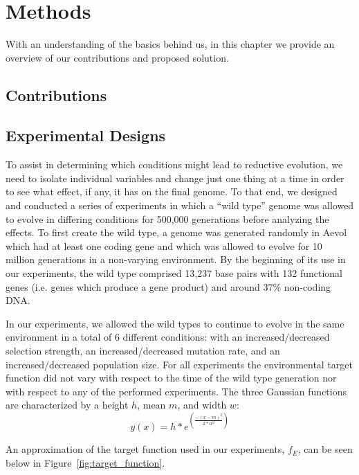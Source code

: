 \chapter{Methods}\label{ch:methods}
With an understanding of the basics behind us, in this chapter we provide an overview of our contributions and proposed solution.

\section{Contributions}

\section{Experimental Designs} \label{experimental_design}
To assist in determining which conditions might lead to reductive evolution, we need to isolate individual variables and change just one thing at a time in order to see what effect, if any, it has on the final genome. To that end, we designed and conducted a series of experiments in which a ``wild type'' genome was allowed to evolve in differing conditions for 500,000 generations before analyzing the effects. To first create the wild type, a genome was generated randomly in Aevol which had at least one coding gene and which was allowed to evolve for 10 million generations in a non-varying environment. By the beginning of its use in our experiments, the wild type comprised 13,237 base pairs with 132 functional genes (i.e. genes which produce a gene product) and around 37\% non-coding DNA. 

In our experiments, we allowed the wild types to continue to evolve in the same environment in a total of 6 different conditions: with an increased/decreased selection strength, an increased/decreased mutation rate, and an increased/decreased population size.  For all experiments the environmental target function did not vary with respect to the time of the wild type generation nor with respect to any of the performed experiments. The three Gaussian functions are characterized by a height $h$, mean $m$, and width $w$:
\begin{equation*}
y(x) = h * e^{\left(\frac{-(x-m)^2}{2 * w^2} \right)}
\end{equation*}

An approximation of the target function used in our experiments, $f_E$, can be seen below in Figure~\ref{fig:target_function}. 

